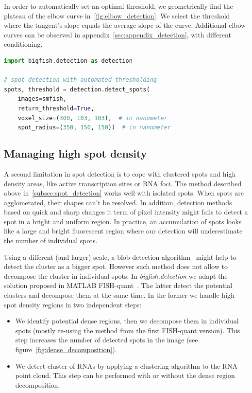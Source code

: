 In order to automatically set an optimal threshold, we geometrically find the plateau of the elbow curve in~\ref{fig:elbow_detection}.
We select the threshold where the tangent's slope equals the average slope of the curve.
Additional elbow curves can be observed in appendix~\ref{sec:appendix_detection}, with different conditioning.\\

\begin{minipage}{0.9\textwidth}
\begin{lstlisting}[language=Python]
import bigfish.detection as detection

# spot detection with automated thresholding
spots, threshold = detection.detect_spots(
    images=smfish,
    return_threshold=True,
    voxel_size=(300, 103, 103),  # in nanometer
    spot_radius=(350, 150, 150))  # in nanometer
\end{lstlisting}
\end{minipage}

\subsection{Managing high spot density}
\label{subsec:dense_decomposition}

A second limitation in spot detection is to cope with clustered spots and high density areas, like active transcription sites or \ac{RNA} foci.
The method described above in~\ref{subsec:spot_detection} works well with isolated spots.
When spots are agglomerated, their shapes can't be resolved.
In addition, detection methods based on quick and sharp changes it term of pixel intensity might fails to detect a spot in a bright and uniform region.
In practice, an accumulation of spots looks like a large and bright fluorescent region where our detection will underestimate the number of individual spots.

Using a different (and larger) scale, a blob detection algorithm~\cite{walt_scikit-image_2014} might help to detect the cluster as a bigger spot.
However such method does not allow to decompose the cluster in individual spots.
In \emph{bigfish.detection} we adapt the solution proposed in MATLAB FISH-quant~\cite{mueller_fish-quant_2013}.
The latter detect the potential clusters and decompose them at the same time.
In the former we handle high spot density regions in two independent steps:

\begin{itemize}
	\setlength\itemsep{0.1em}
	\item We identify potential dense regions, then we decompose them in individual spots (mostly re-using the method from the first FISH-quant version).
	This step increases the number of detected spots in the image (see figure~\ref{fig:dense_decomposition}).
	\item We detect cluster of \ac{RNA}s by applying a clustering algorithm to the \ac{RNA} point cloud.
	This step can be performed with or without the dense region decomposition.
\end{itemize}

